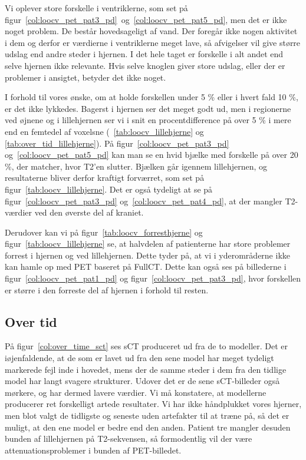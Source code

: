 Vi oplever store forskelle i ventriklerne, som set på figur~\ref{col:loocv_pet_pat3_pd}~og~\ref{col:loocv_pet_pat5_pd},  men det er ikke noget problem. De består hovedsageligt af vand. Der foregår ikke nogen aktivitet i dem og derfor er værdierne i ventriklerne meget lave, så afvigelser vil give større udslag end andre steder i hjernen. I det hele taget er forskelle i alt andet end selve hjernen ikke relevante. Hvis selve knoglen giver store udslag, eller der er problemer i ansigtet, betyder det ikke noget.


I forhold til vores ønske, om at holde forskellen under 5 \% eller i hvert fald 10 \%,  er det ikke lykkedes. Bagerst i hjernen ser det meget godt ud, men i regionerne ved øjnene og i lillehjernen ser vi i snit en procentdifference på over 5 \% i mere end en femtedel af voxelsne (~\ref{tab:loocv_lillehjerne} og \ref{tab:over_tid_lillehjerne}). På figur~\ref{col:loocv_pet_pat3_pd} og~\ref{col:loocv_pet_pat5_pd}  kan man se en hvid bjælke med forskelle på over 20 \%, der matcher, hvor T2’en slutter. Bjælken går igennem lillehjernen, og resultaterne bliver derfor kraftigt forværret, som set på figur~\ref{tab:loocv_lillehjerne}. Det er også tydeligt at se på figur~\ref{col:loocv_pet_pat3_pd} og~\ref{col:loocv_pet_pat4_pd}, at der mangler T2-værdier ved den øverste del af kraniet.


Derudover kan vi på figur~\ref{tab:loocv_forresthjerne} og figur~\ref{tab:loocv_lillehjerne} se, at halvdelen af patienterne har store problemer forrest i hjernen og ved lillehjernen. Dette tyder på, at vi i yderområderne ikke kan hamle op med PET baseret på FullCT. Dette kan også ses på billederne i figur~\ref{col:loocv_pet_pat1_pd} og figur~\ref{col:loocv_pet_pat3_pd}, hvor forskellen er større i den forreste del af hjernen i forhold til resten.

\subsection{Over tid}

På figur~\ref{col:over_time_sct} ses sCT produceret ud fra
de to modeller. Det er iøjenfaldende, at de som er lavet ud fra den sene model
har meget tydeligt markerede fejl inde i hovedet, mens der de samme
steder i dem fra den tidlige model har langt svagere strukturer. Udover
det er de sene sCT-billeder også mørkere, og har dermed lavere værdier. Vi må
konstatere, at modellerne producerer ret forskelligt artede resultater.
Vi har ikke håndplukket vores hjerner, men blot valgt de tidligste
og seneste uden artefakter til at træne på, så det er muligt, at
den ene model er bedre end den anden. Patient tre mangler desuden
bunden af lillehjernen på T2-sekvensen, så formodentlig vil der være
attenuationsproblemer i bunden af PET-billedet.

